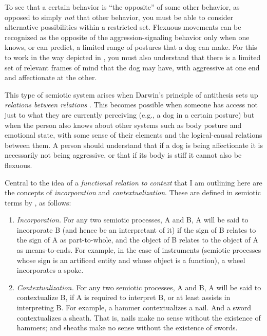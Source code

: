 To see that a certain behavior is ``the opposite'' of some 
other behavior, as opposed to simply \textit{not} that other behavior, 
you must be able to consider alternative possibilities within a 
restricted set. Flexuous movements can be recognized as the opposite of 
the aggression-signaling behavior only when one knows, or can predict, a 
limited range of postures that a dog can make. For this to work in 
the way depicted in , you must also understand that there is a 
limited set of relevant frames of mind that the dog may have, with aggressive at one end and affectionate at the other. 



This type of semiotic system arises when Darwin's principle of 
antithesis sets up \textit{relations between relations} \citep[12--17]{kockelman_agent_2013}. This becomes possible when someone has access not just to what they are currently perceiving (e.g., a dog in a certain posture) but when the person also knows about other systems such as body 
posture and emotional state, with some sense of their elements 
and the logical-causal relations between them. A person should understand that if a dog is 
being affectionate it is necessarily not being aggressive, or that if 
its body is stiff it cannot also be flexuous. 



Central to the idea of a \textit{functional relation to context} that I am outlining here are the concepts of \textit{incorporation }and 
\textit{contextualization}. These are defined in semiotic terms by 
\citet[29]{kockelman_residence_2006}, as follows:



\begin{enumerate}
\item[]\textit{Incorporation.} For any two semiotic processes, A and B, A will be said to incorporate B 
(and hence be an interpretant of it) if the sign of B relates to the 
sign of A as part-to-whole, and the object of B relates to the object of 
A as means-to-ends. For example, in the case of instruments (semiotic 
processes whose sign is an artificed entity and whose object is a 
function), a wheel incorporates a spoke.



\item[]\textit{Contextualization.} For any two semiotic processes, A and B, A will be said to contextualize 
B, if A is required to interpret B, or at least assists in interpreting 
B. For example, a hammer contextualizes a nail. And a sword 
contextualizes a sheath. That is, nails make no sense without the 
existence of hammers; and sheaths make no sense without the existence of 
swords.
\end{enumerate}



